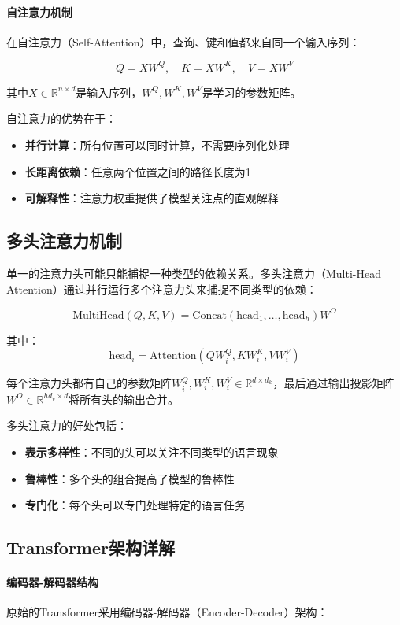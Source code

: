 \paragraph{自注意力机制}
在自注意力（Self-Attention）中，查询、键和值都来自同一个输入序列：

$$Q = XW^Q, \quad K = XW^K, \quad V = XW^V$$

其中$X \in \mathbb{R}^{n \times d}$是输入序列，$W^Q, W^K, W^V$是学习的参数矩阵。

自注意力的优势在于：
\begin{itemize}
\item \textbf{并行计算}：所有位置可以同时计算，不需要序列化处理
\item \textbf{长距离依赖}：任意两个位置之间的路径长度为1
\item \textbf{可解释性}：注意力权重提供了模型关注点的直观解释
\end{itemize}

\subsection{多头注意力机制}

单一的注意力头可能只能捕捉一种类型的依赖关系。多头注意力（Multi-Head Attention）通过并行运行多个注意力头来捕捉不同类型的依赖：

$$\text{MultiHead}(Q, K, V) = \text{Concat}(\text{head}_1, \ldots, \text{head}_h)W^O$$

其中：
$$\text{head}_i = \text{Attention}(QW_i^Q, KW_i^K, VW_i^V)$$

每个注意力头都有自己的参数矩阵$W_i^Q, W_i^K, W_i^V \in \mathbb{R}^{d \times d_k}$，最后通过输出投影矩阵$W^O \in \mathbb{R}^{hd_v \times d}$将所有头的输出合并。

多头注意力的好处包括：
\begin{itemize}
\item \textbf{表示多样性}：不同的头可以关注不同类型的语言现象
\item \textbf{鲁棒性}：多个头的组合提高了模型的鲁棒性
\item \textbf{专门化}：每个头可以专门处理特定的语言任务
\end{itemize}

\subsection{Transformer架构详解}

\paragraph{编码器-解码器结构}
原始的Transformer采用编码器-解码器（Encoder-Decoder）架构：

